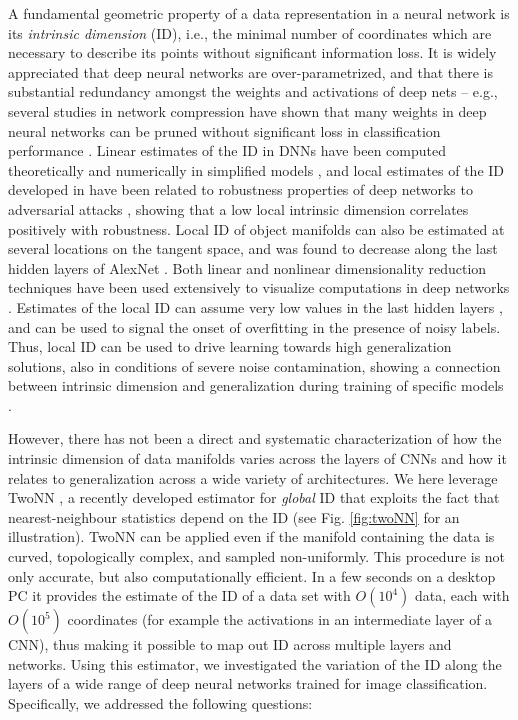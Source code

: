 \documentclass{article}
\begin{document}
A fundamental geometric property of a data representation in a neural network is its \emph{intrinsic dimension} (ID), i.e., the minimal number of coordinates which are necessary to describe its points without significant information loss. 
It is widely appreciated that deep neural networks are over-parametrized, and that there is substantial redundancy amongst the weights and activations of deep nets -- e.g., several studies in network compression have shown that many weights in deep neural networks can be pruned without significant loss in classification performance \cite{denil2013predicting,LeCunDenker_90}.
Linear estimates of the ID in DNNs have been computed theoretically and numerically in simplified models \cite{huang2018mechanisms}, and local estimates of the ID developed in \cite{amsaleg2015estimating} have been related to robustness properties of deep networks to adversarial attacks \cite{amsaleg2017vulnerability,Xingjun2018}, showing that a low local intrinsic dimension correlates positively with robustness. 
Local ID of object manifolds can also be estimated at several locations on the tangent space, and was found to decrease along the last hidden layers of AlexNet \cite{yu2018curvature,krizhevsky2012imagenet}.  Both linear and nonlinear dimensionality reduction techniques have been used extensively to visualize computations in deep networks \cite{raghu2017svcca,morcos2018insights,BarrettMorcos_19}. Estimates of the  local ID \cite{amsaleg2015estimating} can assume very low values in the last hidden layers \cite{Ma_2018}, and can be used to signal the onset of overfitting in  the presence of noisy labels. Thus, local ID can be used to drive learning towards high generalization solutions, also in conditions of severe noise contamination, showing a connection between intrinsic dimension and generalization during training of specific models \cite{Ma_2018}.

However, there has not been a direct and systematic characterization of how the intrinsic dimension of data manifolds varies across the layers of CNNs and how it relates to generalization across a wide variety of architectures. We here leverage TwoNN \cite{facco2017estimating}, a recently developed estimator for \emph{global} ID that exploits the fact that nearest-neighbour statistics depend on the ID \cite{LevinaBickel_05} (see Fig. \ref{fig:twoNN} for an illustration). TwoNN can be applied even if the manifold containing the data is curved, topologically complex, and sampled non-uniformly. 
This procedure is not only accurate, but also computationally efficient. In a few seconds on a desktop PC it provides the estimate of the ID of a data set with $O(10^4)$ data, each with  $O(10^5)$ coordinates (for example the activations in an intermediate layer of a CNN), thus making it possible to map out ID across multiple layers and networks. Using this estimator, we investigated the variation of the ID along the layers of a wide range of deep neural networks trained for image classification. Specifically, we addressed the following questions: 
\end{document}
